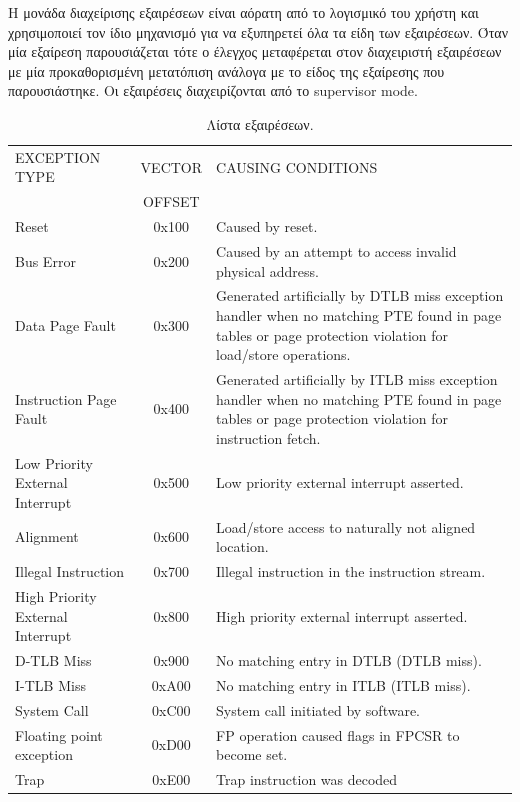 \documentclass[a4paper,10pt]{article}
\numberwithin{figure}{section}
\numberwithin{table}{section}
\begin{document}
Η μονάδα διαχείρισης εξαιρέσεων είναι αόρατη από το λογισμικό του χρήστη και χρησιμοποιεί τον ίδιο
μηχανισμό για να εξυπηρετεί όλα τα είδη των εξαιρέσεων. Όταν μία εξαίρεση παρουσιάζεται τότε ο έλεγχος
μεταφέρεται στον διαχειριστή εξαιρέσεων με μία προκαθορισμένη μετατόπιση ανάλογα με το είδος της εξαίρεσης που παρουσιάστηκε. 
Οι εξαιρέσεις διαχειρίζονται από το supervisor mode.

{%
\renewcommand{\arraystretch}{1.2}
\setlength{\tabcolsep}{0.3em}
\newcommand{\mc}[3]{\multicolumn{#1}{#2}{#3}}
\begin{table}[h!]
\begin{center}
\begin{tabular}{|l|c|p{6 cm}|}
\hline
\rowcolor{tcA}
EXCEPTION TYPE & VECTOR & CAUSING CONDITIONS\\
\rowcolor{tcA}
 & OFFSET & \\\hline
Reset & 0x100 & Caused by reset.\\\hline
Bus Error & 0x200 & Caused by an attempt to access invalid physical
address.\\\hline
Data Page Fault & 0x300 & Generated artificially by DTLB miss exception
handler when no matching PTE found in page
tables or page protection violation for load/store
operations.\\\hline
Instruction Page
Fault & 0x400 & Generated artificially by ITLB miss exception
handler when no matching PTE found in page
tables or page protection violation for instruction
fetch.\\\hline
Low Priority External
Interrupt & 0x500 & Low priority external interrupt asserted.\\\hline
Alignment & 0x600 & Load/store access to naturally not aligned
location.\\\hline
Illegal Instruction & 0x700 & Illegal instruction in the instruction stream.\\\hline
High Priority
External Interrupt & 0x800 & High priority external interrupt asserted.\\\hline
D-TLB Miss & 0x900 & No matching entry in DTLB (DTLB miss).\\\hline
I-TLB Miss & 0xA00 & No matching entry in ITLB (ITLB miss).\\\hline
System Call & 0xC00 & System call initiated by software.\\\hline
Floating point
exception & 0xD00 & FP operation caused flags in FPCSR to become
set.\\\hline
Trap & 0xE00 & Trap instruction was decoded\\\hline
\end{tabular}
\end{center}
\caption{Λίστα εξαιρέσεων.}
\end{table}
}%
\end{document}
